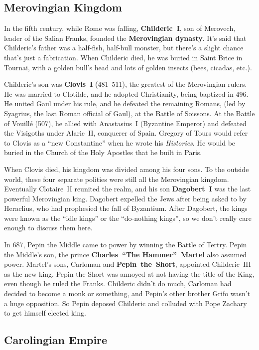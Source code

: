 \subsection*{Merovingian Kingdom}

In the fifth century, while Rome was falling,
\textbf{Childeric~I}, son of Merovech, leader of the Salian Franks, founded the \textbf{Merovingian dynasty}.
It's said that Childeric's father was a half-fish, half-bull monster,
but there's a slight chance that's just a fabrication.
When Childeric died, he was buried in Saint Brice in Tournai,
with a golden bull's head and lots of golden insects (bees, cicadas, etc.).

Childeric's son was \textbf{Clovis~I} (481--511), the greatest of the Merovingian rulers.
He was married to Clotilde, and he adopted Christianity, being baptized in 496.
He united Gaul under his rule, and he defeated the remaining Romans,
(led by Syagrius, the last Roman official of Gaul), at the Battle of Soissons.
At the Battle of Vouill\'e (507), he allied with Anastasius~I (Byzantine Emperor)
and defeated the Visigoths under Alaric~II, conquerer of Spain.
Gregory of Tours would refer to Clovis as a ``new Constantine'' when he wrote his \textit{Histories}.
He would be buried in the Church of the Holy Apostles that he built in Paris.

When Clovis died, his kingdom was divided among his four sons.
To the outside world, these four separate polities were still all the Merovingian kingdom.
Eventually Clotaire~II reunited the realm, and his son \textbf{Dagobert~I} was the last powerful Merovingian king.
Dagobert expelled the Jews after being asked to by Heraclius, who had prophesied the fall of Byzantium.
After Dagobert, the kings were known as the ``idle kings'' or the ``do-nothing kings'',
so we don't really care enough to discuss them here.

In 687, Pepin the Middle came to power by winning the Battle of Tertry.
Pepin the Middle's son, the prince \textbf{Charles~``The Hammer''~Martel} also assumed power.
Martel's sons, Carloman and \textbf{Pepin~the~Short}, appointed Childeric~III as the new king.
Pepin the Short was annoyed at not having the title of the King, even though he ruled the Franks.
Childeric didn't do much, Carloman had decided to become a monk or something,
and Pepin's other brother Grifo wasn't a huge opposition.
So Pepin deposed Childeric and colluded with Pope Zachary to get himself elected king.

\subsection*{Carolingian Empire}

